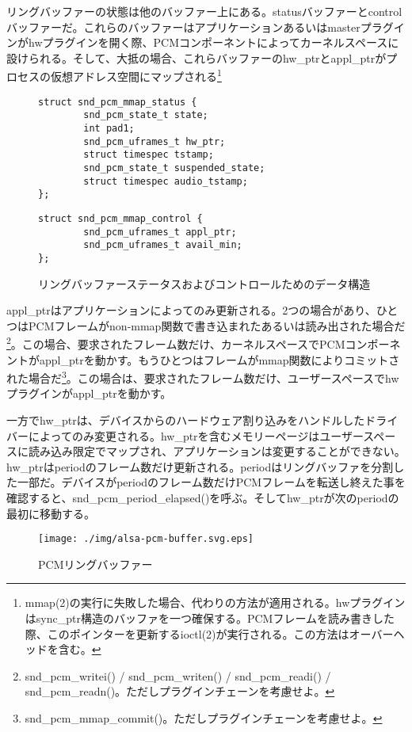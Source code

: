 \documentclass[onecolumn]{jarticle}
\begin{document}
リングバッファーの状態は他のバッファー上にある。statusバッファーとcontrolバッファーだ。これらのバッファーはアプリケーションあるいはmasterプラグインがhwプラグインを開く際、PCMコンポーネントによってカーネルスペースに設けられる。そして、大抵の場合、これらバッファーのhw\_ptrとappl\_ptrがプロセスの仮想アドレス空間にマップされる\footnote{mmap(2)の実行に失敗した場合、代わりの方法が適用される。hwプラグインはsync\_ptr構造のバッファを一つ確保する。PCMフレームを読み書きした際、このポインターを更新するioctl(2)が実行される。この方法はオーバーヘッドを含む。}


\begin{figure}
\small
\begin{verbatim}
struct snd_pcm_mmap_status {
        snd_pcm_state_t state;
        int pad1;
        snd_pcm_uframes_t hw_ptr;
        struct timespec tstamp;
        snd_pcm_state_t suspended_state;
        struct timespec audio_tstamp;
};
\end{verbatim}
\begin{verbatim}
struct snd_pcm_mmap_control {
        snd_pcm_uframes_t appl_ptr;
        snd_pcm_uframes_t avail_min;
};
\end{verbatim}
\caption{{リングバッファーステータスおよびコントロールためのデータ構造}}
\label{pcm-mmap-status-control}
\end{figure}

appl\_ptrはアプリケーションによってのみ更新される。2つの場合があり、ひとつはPCMフレームがnon-mmap関数で書き込まれたあるいは読み出された場合だ\footnote{snd\_pcm\_writei() / snd\_pcm\_writen() / snd\_pcm\_readi() / snd\_pcm\_readn()。ただしプラグインチェーンを考慮せよ。}。この場合、要求されたフレーム数だけ、カーネルスペースでPCMコンポーネントがappl\_ptrを動かす。もうひとつはフレームがmmap関数によりコミットされた場合だ\footnote{snd\_pcm\_mmap\_commit()。ただしプラグインチェーンを考慮せよ。}。この場合は、要求されたフレーム数だけ、ユーザースペースでhwプラグインがappl\_ptrを動かす。

一方でhw\_ptrは、デバイスからのハードウェア割り込みをハンドルしたドライバーによってのみ変更される。hw\_ptrを含むメモリーページはユーザースペースに読み込み限定でマップされ、アプリケーションは変更することができない。hw\_ptrはperiodのフレーム数だけ更新される。periodはリングバッファを分割した一部だ。デバイスがperiodのフレーム数だけPCMフレームを転送し終えた事を確認すると、snd\_pcm\_period\_elapsed()を呼ぶ。そしてhw\_ptrが次のperiodの最初に移動する。


\begin{figure}[H]
	\centering
	\texttt{[image: ./img/alsa-pcm-buffer.svg.eps]}
	\caption{{PCMリングバッファー}}
	\label{alsa-pcm-buffer}
\end{figure}
\end{document}
